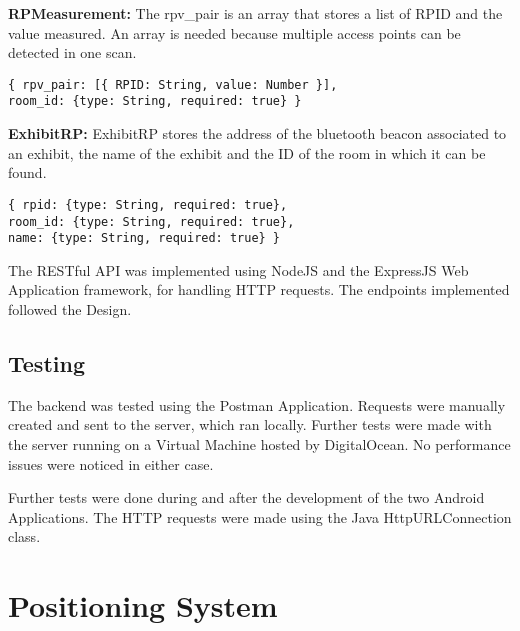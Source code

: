 \noindent
\textbf{RPMeasurement:}
The rpv\_pair is an array that stores a list of RPID and the value measured. An array is needed because multiple access points can be detected in one scan. 
\begin{lstlisting}
{ rpv_pair: [{ RPID: String, value: Number }], 
room_id: {type: String, required: true} }
\end{lstlisting}

\noindent
\textbf{ExhibitRP:}
ExhibitRP stores the address of the bluetooth beacon associated to an exhibit, the name of the exhibit and the ID of the room in which it can be found.
\begin{lstlisting}
{ rpid: {type: String, required: true},
room_id: {type: String, required: true},
name: {type: String, required: true} }
\end{lstlisting}

The RESTful API was implemented using NodeJS and the ExpressJS Web Application framework, for handling HTTP requests. The endpoints implemented followed the Design.

\subsection{Testing}
The backend was tested using the Postman Application. Requests were manually created and sent to the server, which ran locally. Further tests were made with the server running on a Virtual Machine hosted by DigitalOcean. No performance issues were noticed in either case.

Further tests were done during and after the development of the two Android Applications. The HTTP requests were made using the Java HttpURLConnection class.

\section{Positioning System}

